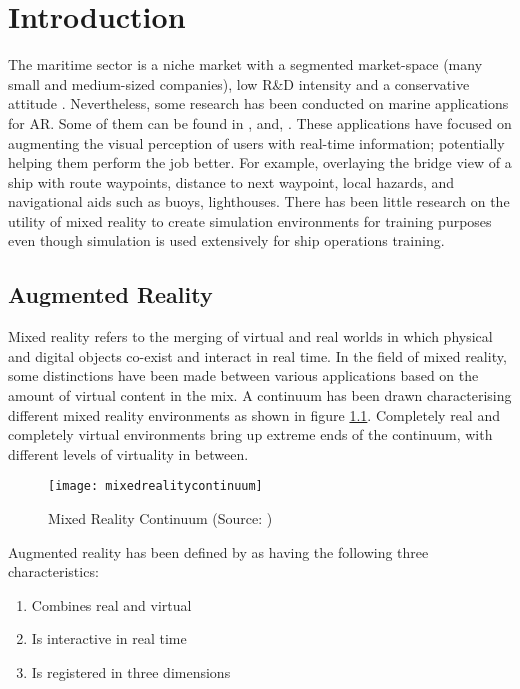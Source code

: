 \chapter{Introduction}

The maritime sector is a niche market with a segmented market-space (many small and medium-sized companies), low R\&D intensity and a conservative attitude \parencite{von2014maritime}. Nevertheless, some research has been conducted on marine applications for AR. Some of them can be found in \cite{hugues2010experimental}, \cite{vasiljevic2011augmented} and, \cite{von2014maritime}. These applications have focused on augmenting the visual perception of users with real-time information; potentially helping them perform the job better. For example, overlaying the bridge view of a ship with route waypoints, distance to next waypoint, local hazards, and navigational aids such as buoys, lighthouses. There has been little research on the utility of mixed reality to create simulation environments for training purposes even though simulation is used extensively for ship operations training.

\section{Augmented Reality}
\label{sec:augreal}
Mixed reality refers to the merging of virtual and real worlds in which physical and digital objects co-exist and interact in real time. In the field of mixed reality, some distinctions have been made between various applications based on the amount of virtual content in the mix. A continuum has been drawn characterising different mixed reality environments as shown in figure \ref{fig:mixedrealitycontinuum}. Completely real and completely virtual environments bring up extreme ends of the continuum, with different levels of virtuality in between. 

\begin{figure}
	\centering
	\texttt{[image: mixedrealitycontinuum]}
	\caption{Mixed Reality Continuum (Source: \cite{milgram1995augmented})}
	\label{fig:mixedrealitycontinuum}
\end{figure}

Augmented reality has been defined by \textcite{azuma1997survey} as having the following three characteristics: 

\begin{enumerate}
	\item Combines real and virtual 
	\item Is interactive in real time
	\item Is registered in three dimensions
\end{enumerate} 

